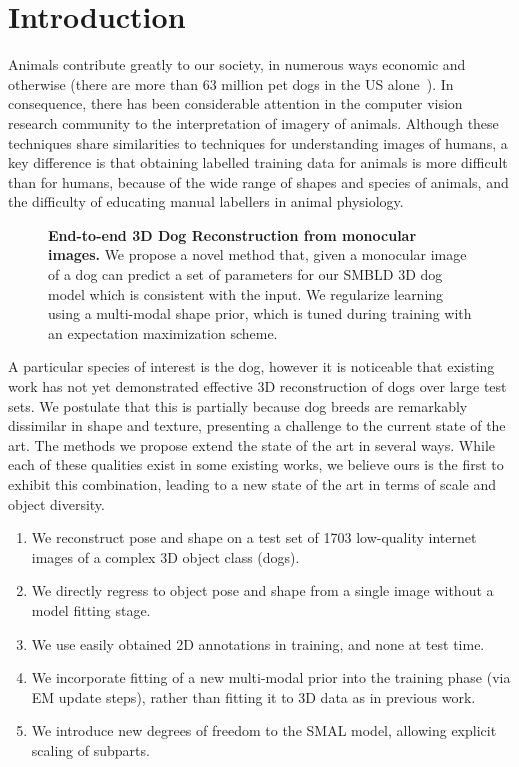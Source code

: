 \section{Introduction}
Animals contribute greatly to our society, in numerous ways economic and otherwise (there are more than 63 million pet dogs in the US alone~\cite{appa20}).
In consequence, there has been considerable attention in the computer vision research community to the interpretation of imagery of animals.
Although these techniques share similarities to techniques for understanding images of humans, a key difference is that obtaining labelled training data for animals is more difficult than for humans, because of the wide range of shapes and species of animals, and the difficulty of educating manual labellers in animal physiology.
\begin{figure}[t]
\medbreak
\caption{
\textbf{End-to-end 3D Dog Reconstruction from monocular images.}
We propose a novel method that, given a monocular image of a dog can predict a set of parameters for our SMBLD 3D dog model which is consistent with the input. We regularize learning using a multi-modal shape prior, which is tuned during training with an expectation maximization scheme.\label{fig:splash}}
\end{figure}

A particular species of interest is the dog, however it is noticeable that existing work has not yet demonstrated effective 3D reconstruction of dogs over large test sets.
We postulate that this is partially because dog breeds are remarkably dissimilar in shape and texture, presenting a challenge to the current state of the art.
The methods we propose extend the state of the art in several ways.
While each of these qualities exist in some existing works, we believe ours is the first to exhibit this combination, leading to a new state of the art in terms of scale and object diversity.
\begin{enumerate}
    \item We reconstruct pose and shape on a test set of 1703 low-quality internet images of a complex 3D object class (dogs).
    \item We directly regress to object pose and shape from a single image without a model fitting stage.
    \item We use easily obtained 2D annotations in training, and none at test time.
    \item We incorporate fitting of a new multi-modal prior into the training phase (via EM update steps), rather than fitting it to 3D data as in previous work.
    \item We introduce new degrees of freedom to the SMAL model, 
    allowing explicit scaling of subparts.
\end{enumerate}

